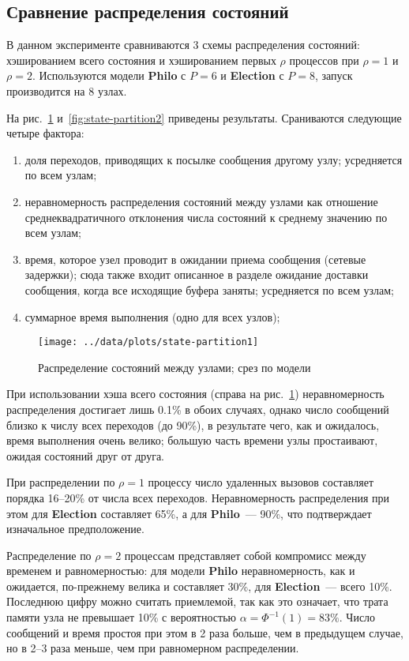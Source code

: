 \documentclass[12pt,a4paper,fleqn]{article}
\newcommand{\Code}[1]{\textbf{\mbox{#1}}}
\begin{document}
\subsection{Сравнение распределения состояний}

В данном эксперименте сравниваются 3 схемы распределения состояний: хэшированием всего состояния и
хэшированием первых $\rho$ процессов при $\rho = 1$ и $\rho = 2$. Используются модели \Code{Philo} с
$P = 6$ и \Code{Election} с $P = 8$, запуск производится на 8 узлах.

На рис.~\ref{fig:state-partition1} и~\ref{fig:state-partition2} приведены
результаты. Сраниваются следующие четыре фактора:
\begin{enumerate}
\item доля переходов, приводящих к посылке сообщения другому узлу; усредняется по всем узлам;
\item неравномерность распределения состояний между узлами как отношение среднеквадратичного
  отклонения числа состояний к среднему значению по всем узлам;
\item время, которое узел проводит в ожидании приема сообщения (сетевые задержки); сюда также входит
  описанное в разделе ожидание доставки сообщения, когда все исходящие буфера заняты; усредняется по
  всем узлам;
\item суммарное время выполнения (одно для всех узлов);
\end{enumerate}

\begin{figure}[htb]
  \centering
  \texttt{[image: ../data/plots/state-partition1]}
  \caption{Распределение состояний между узлами; срез по модели}
  \label{fig:state-partition1}
\end{figure}

При использовании хэша всего состояния (справа на рис.~\ref{fig:state-partition1}) неравномерность
распределения достигает лишь 0.1\% в обоих случаях, однако число сообщений близко к числу всех
переходов (до 90\%), в результате чего, как и ожидалось, время выполнения очень велико; большую
часть времени узлы простаивают, ожидая состояний друг от друга.

При распределении по $\rho = 1$ процессу число удаленных вызовов составляет порядка
16--20\% от числа всех переходов. Неравномерность распределения при этом для
\Code{Election} составляет 65\%, а для \Code{Philo}~--- 90\%, что подтверждает изначальное
предположение.

Распределение по $\rho = 2$ процессам представляет собой компромисс между временем и равномерностью:
для модели \Code{Philo} неравномерность, как и ожидается, по-прежнему велика и составляет 30\%, для
\Code{Election}~--- всего 10\%. Последнюю цифру можно считать приемлемой, так как это означает, что
трата памяти узла не превышает 10\% с вероятностью $\alpha = \Phi^{-1}(1) = 83\%$. Число сообщений и
время простоя при этом в 2 раза больше, чем в предыдущем случае, но в 2--3 раза меньше, чем при
равномерном распределении.
\end{document}
